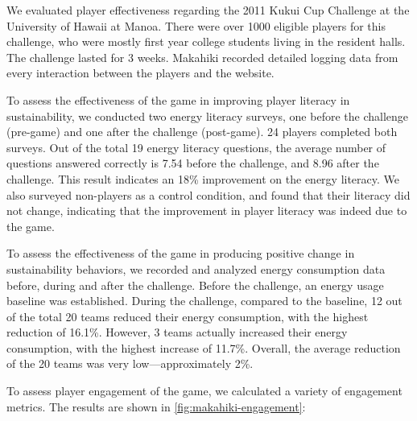 \documentclass{sigchi}
\begin{document}
We evaluated player effectiveness regarding the 2011 Kukui Cup Challenge at the University of
Hawaii at Manoa. There were over 1000 eligible players for this challenge, who were mostly
first year college students living in the resident halls. The challenge lasted for 3
weeks.  Makahiki recorded detailed logging data from every interaction between the players
and the website.

To assess the effectiveness of the game in improving player literacy in sustainability, we
conducted two energy literacy surveys, one before the challenge (pre-game) and one after
the challenge (post-game). 24 players completed both surveys. Out of the total 19 energy
literacy questions, the average number of questions answered correctly is 7.54 before the
challenge, and 8.96 after the challenge. This result indicates an 18\% improvement on the
energy literacy.  We also surveyed non-players as a control condition, and found that
their literacy did not change, indicating that the improvement in player literacy was
indeed due to the game. 

To assess the effectiveness of the game in producing positive change in sustainability
behaviors, we recorded and analyzed energy consumption data before, during and after the
challenge.  Before the challenge, an energy usage baseline was established. During the
challenge, compared to the baseline, 12 out of the total 20 teams reduced their energy
consumption, with the highest reduction of 16.1\%. However, 3 teams actually increased
their energy consumption, with the highest increase of 11.7\%. Overall, the average
reduction of the 20 teams was very low---approximately 2\%.

To assess player engagement of the game, we calculated a variety of engagement
metrics. The results are shown in \autoref{fig:makahiki-engagement}:
\end{document}
